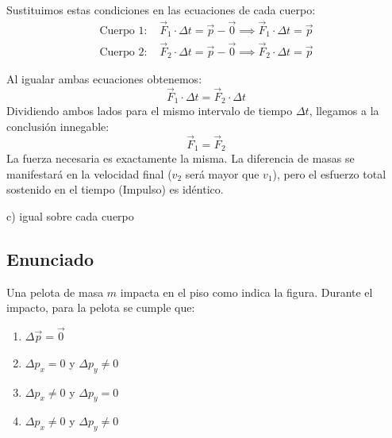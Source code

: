 \documentclass[12pt, a4paper]{article}
\begin{document}
Sustituimos estas condiciones en las ecuaciones de cada cuerpo:
\begin{align*}
    \text{Cuerpo 1: } & \vec{F}_1 \cdot \Delta t = \vec{p} - \vec{0} \implies \vec{F}_1 \cdot \Delta t = \vec{p} \\
    \text{Cuerpo 2: } & \vec{F}_2 \cdot \Delta t = \vec{p} - \vec{0} \implies \vec{F}_2 \cdot \Delta t = \vec{p}
\end{align*}

Al igualar ambas ecuaciones obtenemos:
$$ \vec{F}_1 \cdot \Delta t = \vec{F}_2 \cdot \Delta t $$
Dividiendo ambos lados para el mismo intervalo de tiempo $\Delta t$, llegamos a la conclusión innegable:
$$ \vec{F}_1 = \vec{F}_2 $$
La fuerza necesaria es exactamente la misma. La diferencia de masas se manifestará en la velocidad final ($v_2$ será mayor que $v_1$), pero el esfuerzo total sostenido en el tiempo (Impulso) es idéntico.

\begin{tcolorbox}[colback=green!5!white, colframe=green!50!black, title=Respuesta Final]
\centering \Large c) igual sobre cada cuerpo
\end{tcolorbox}

\newpage

\subsection*{Enunciado}
Una pelota de masa $m$ impacta en el piso como indica la figura. Durante el impacto, para la pelota se cumple que:

\begin{center}
\end{center}

\begin{enumerate}[label=\alph*)]
    \item $\Delta \vec{p} = \vec{0}$
    \item $\Delta p_x = 0$ y $\Delta p_y \neq 0$
    \item $\Delta p_x \neq 0$ y $\Delta p_y = 0$
    \item $\Delta p_x \neq 0$ y $\Delta p_y \neq 0$
\end{enumerate}
\end{document}

